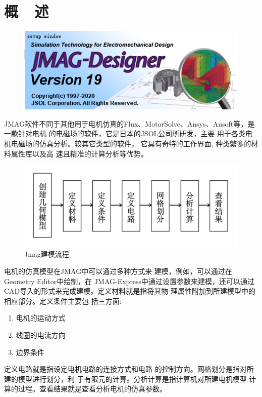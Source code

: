 \documentclass{thuemp}
\begin{document}
\section{概~~述}
\enlargethispage{-3.3cm}
\begin{figure}[H]
  \centering
  \includegraphics[width=0.8\linewidth]{./img/jmag.png}
\end{figure}
JMAG软件不同于其他用于电机仿真的Flux、MotorSolve、Ansys、Ansoft等，是一款针对电机
的电磁场的软件，它是日本的JSOL公司所研发，主要
用于各类电机电磁场的仿真分析。较其它类型的软件，
它具有奇特的工作界面, 种类繁多的材料属性库以及高
速且精准的计算分析等优势。

\begin{figure}[H]
  \centering
  \includegraphics[width=1\linewidth]{./img/jmag_flow.png}
  \caption{Jmag建模流程}
  \end{figure}

电机的仿真模型在JMAG中可以通过多种方式来
建模，例如，可以通过在Geometry Editor中绘制，在
JMAG-Express中通过设置参数来建模，还可以通过
CAD导入的形式来完成建模。定义材料就是指将其物
理属性附加到所建模型中的相应部分。定义条件主要包
括三方面:

\begin{enumerate}
	\item 电机的运动方式
	\item 线圈的电流方向
	\item 边界条件
\end{enumerate}

定义电路就是指设定电机电路的连接方式和电路
的控制方向。网格划分是指对所建的模型进行划分，利
于有限元的计算。分析计算是指计算机对所建电机模型
计算的过程。查看结果就是查看分析电机的仿真参数。
\end{document}
